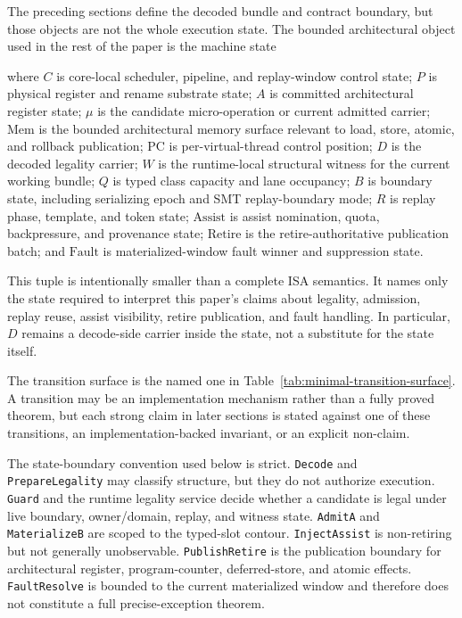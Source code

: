 \documentclass[twocolumn]{article}
\begin{document}
The preceding sections define the decoded bundle and contract boundary, but those objects are not the whole execution state. The bounded architectural object used in the rest of the paper is the machine state



where \(C\) is core-local scheduler, pipeline, and replay-window control state; \(P\) is physical register and rename substrate state; \(A\) is committed architectural register state; \(\mu\) is the candidate micro-operation or current admitted carrier; \(\mathrm{Mem}\) is the bounded architectural memory surface relevant to load, store, atomic, and rollback publication; \(\mathrm{PC}\) is per-virtual-thread control position; \(D\) is the decoded legality carrier; \(W\) is the runtime-local structural witness for the current working bundle; \(Q\) is typed class capacity and lane occupancy; \(B\) is boundary state, including serializing epoch and SMT replay-boundary mode; \(R\) is replay phase, template, and token state; \(\mathrm{Assist}\) is assist nomination, quota, backpressure, and provenance state; \(\mathrm{Retire}\) is the retire-authoritative publication batch; and \(\mathrm{Fault}\) is materialized-window fault winner and suppression state.

This tuple is intentionally smaller than a complete ISA semantics. It names only the state required to interpret this paper's claims about legality, admission, replay reuse, assist visibility, retire publication, and fault handling. In particular, \(D\) remains a decode-side carrier inside the state, not a substitute for the state itself.

The transition surface is the named one in Table~\ref{tab:minimal-transition-surface}. A transition may be an implementation mechanism rather than a fully proved theorem, but each strong claim in later sections is stated against one of these transitions, an implementation-backed invariant, or an explicit non-claim.



The state-boundary convention used below is strict. \texttt{Decode} and \texttt{PrepareLegality} may classify structure, but they do not authorize execution. \texttt{Guard} and the runtime legality service decide whether a candidate is legal under live boundary, owner/domain, replay, and witness state. \texttt{AdmitA} and \texttt{MaterializeB} are scoped to the typed-slot contour. \texttt{InjectAssist} is non-retiring but not generally unobservable. \texttt{PublishRetire} is the publication boundary for architectural register, program-counter, deferred-store, and atomic effects. \texttt{FaultResolve} is bounded to the current materialized window and therefore does not constitute a full precise-exception theorem.
\end{document}
